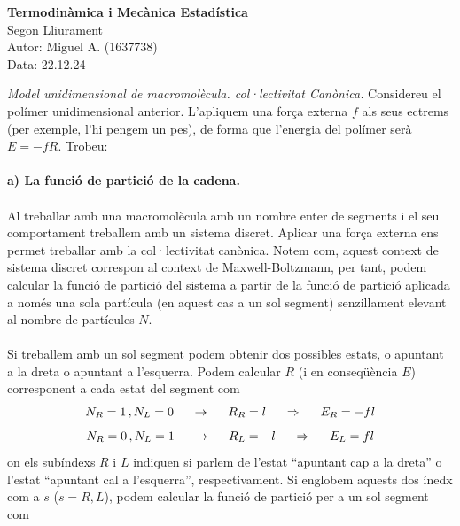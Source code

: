 \documentclass[12pt,twosides,onecolumn,openany]{article}
\begin{document}
\begin{center}
    {\Large \textbf{Termodinàmica i Mecànica Estadística}}\\
    \vspace{0.2cm}
    {\large Segon Lliurament}\\
    \vspace{0.2cm}
    Autor: Miguel A. (1637738)\\
    {\footnotesize Data: 22.12.24}
\end{center}
\textit{Model unidimensional de macromolècula. col·lectivitat Canònica.} Considereu el polímer unidimensional anterior. L'apliquem una força externa $f$ als seus ectrems (per exemple, l'hi pengem un pes), de forma que l'energia del polímer serà $E=-fR$. Trobeu:\\\\
\textbf{a) La funció de partició de la cadena.}\\\\
Al treballar amb una macromolècula amb un nombre enter de segments i el seu comportament treballem amb un sistema discret. Aplicar una força externa ens permet treballar amb la col·lectivitat canònica. Notem com, aquest context de sistema discret correspon al context de Maxwell-Boltzmann, per tant, podem calcular la funció de partició del sistema a partir de la funció de partició aplicada a només una sola partícula (en aquest cas a un sol segment) senzillament elevant al nombre de partícules $N$.\\\\
Si treballem amb un sol segment podem obtenir dos possibles estats, o apuntant a la dreta o apuntant a l'esquerra. Podem calcular $R$ (i en conseqüència $E$) corresponent a cada estat del segment com 
\begin{equation*}
    N_R = 1 \,\mathrm{,}\,N_L= 0 \hspace{0.5cm}\rightarrow \hspace{0.5cm} R_R = l \hspace{0.5cm} \Rightarrow \hspace{0.5cm} E_R = -fl
\end{equation*}
\begin{equation*}
    N_R = 0 \,\mathrm{,}\,N_L= 1 \hspace{0.5cm}\rightarrow \hspace{0.5cm} R_L = -l \hspace{0.5cm} \Rightarrow \hspace{0.5cm} E_L = fl
\end{equation*}
on els subíndexs $R$ i $L$ indiquen si parlem de l'estat ``apuntant cap a la dreta'' o l'estat ``apuntant cal a l'esquerra'', respectivament. Si englobem aquests dos ínedx com a $s$ ($s=R,L$), podem calcular la funció de partició per a un sol segment com 
\end{document}
